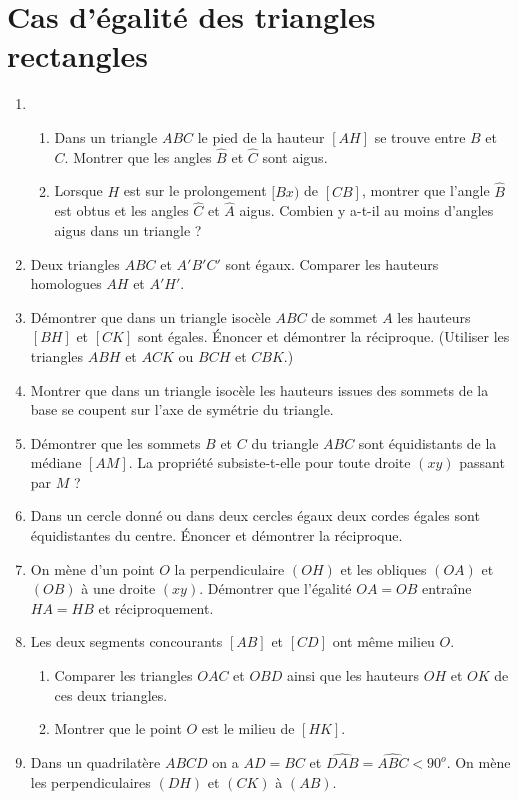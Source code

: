 \documentclass[12 pt]{report}
\theoremstyle{plain}
\newcounter{n}
\begin{document}
\chapter{Cas d'égalité des triangles rectangles}
\begin{enumerate}
\item \begin{enumerate}
\item Dans un triangle $ABC$ le pied de la hauteur $[AH]$ se trouve entre $B$ et $C$.
Montrer que les angles $\widehat{B}$ et $\widehat{C}$ sont aigus. 
\item Lorsque $H$ est sur le prolongement $[Bx)$ de $[CB]$, montrer que l'angle $\widehat{B}$ est obtus et les angles $\widehat{C}$ et $\widehat{A}$ aigus. Combien
y a-t-il au moins d'angles aigus dans un triangle ? 
\end{enumerate}
\item Deux triangles $ABC$ et $A'B'C'$ sont égaux. Comparer les hauteurs homologues 
$AH$ et $A'H'$.
\item Démontrer que dans un triangle isocèle $ABC$ de sommet $A$ les hauteurs $[BH]$ et $[CK]$ sont égales. Énoncer et démontrer la réciproque. (Utiliser les triangles 
$ABH$ et $ACK$ ou $BCH$ et $CBK$.)
\item Montrer que dans un triangle isocèle les hauteurs issues des sommets de la base se coupent sur l'axe de symétrie du triangle. 
\item Démontrer que les sommets $B$ et $C$ du triangle $ABC$ sont équidistants de la médiane $[AM]$. La propriété subsiste-t-elle pour toute droite $(xy)$ passant par $M$ ?
\item Dans un cercle donné ou dans deux cercles égaux deux cordes égales sont équidistantes du centre. Énoncer et démontrer la réciproque. 
\item On mène d'un point $O$ la perpendiculaire $(OH)$ et les obliques $(OA)$ et $(OB)$ à une droite $(xy)$. Démontrer que l'égalité $OA=OB$ entraîne $HA=HB$ et réciproquement. 
\item Les deux segments concourants $[AB]$ et $[CD]$ ont même milieu $O$. 
\begin{enumerate}
\item Comparer les triangles $OAC$ et $OBD$ ainsi que les hauteurs $OH$ et $OK$ de ces deux triangles. 
\item Montrer que le point $O$ est le milieu de $[HK]$.
\end{enumerate}
\item Dans un quadrilatère $ABCD$ on a $AD=BC$ et $\widehat{DAB}= \widehat{ABC}<90^o$. On mène les perpendiculaires $(DH)$ et $(CK)$ à $(AB)$. \begin{enumerate}

\end{enumerate}
\end{enumerate}
\end{document}
